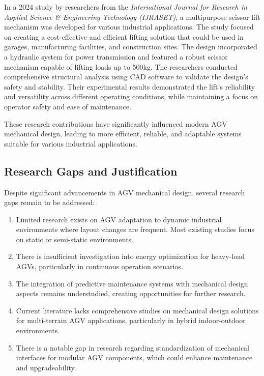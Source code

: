 \documentclass[../../main]{subfiles}
\begin{document}
In a 2024 study by researchers from the \textit{International Journal for Research in Applied Science \& Engineering Technology (IJRASET)}, a multipurpose scissor lift mechanism was developed for various industrial applications. The study focused on creating a cost-effective and efficient lifting solution that could be used in garages, manufacturing facilities, and construction sites. The design incorporated a hydraulic system for power transmission and featured a robust scissor mechanism capable of lifting loads up to 500kg. The researchers conducted comprehensive structural analysis using CAD software to validate the design's safety and stability. Their experimental results demonstrated the lift's reliability and versatility across different operating conditions, while maintaining a focus on operator safety and ease of maintenance.

These research contributions have significantly influenced modern AGV mechanical design, leading to more efficient, reliable, and adaptable systems suitable for various industrial applications.


\subsection{Research Gaps and Justification}
Despite significant advancements in AGV mechanical design, several
research gaps remain to be addressed:

\begin{enumerate}
\item
  Limited research exists on AGV adaptation to dynamic industrial
  environments where layout changes are frequent. Most existing studies
  focus on static or semi-static environments.
\item
  There is insufficient investigation into energy optimization for
  heavy-load AGVs, particularly in continuous operation scenarios.
\item
  The integration of predictive maintenance systems with mechanical
  design aspects remains understudied, creating opportunities for
  further research.
\item
  Current literature lacks comprehensive studies on mechanical design
  solutions for multi-terrain AGV applications, particularly in hybrid
  indoor-outdoor environments.
\item
  There is a notable gap in research regarding standardization of
  mechanical interfaces for modular AGV components, which could enhance
  maintenance and upgradeability.
\end{enumerate}
\end{document}
